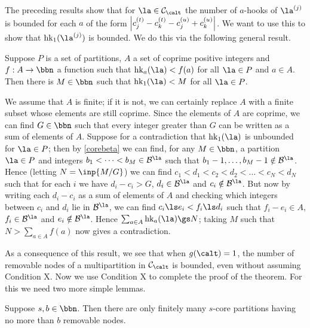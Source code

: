\documentclass[a4paper, 11pt, twoside]{article}
\begin{document}
The preceding results show that for $\la\in\smc\calt$ the number of $a$-hooks of $\cpt\la j$ is bounded for each $a$ of the form $\left|c^{(t)}_j-c^{(t)}_k-c^{(u)}_j+c^{(u)}_k\right|$. We want to use this to show that $\hk1{\cpt\la j}$ is bounded. We do this via the following general result.
	
\begin{propn}\label{hookbd}
Suppose $P$ is a set of partitions, $A$ a set of coprime positive integers and $f:A\to\bbn$ a function such that $\hk a\la<f(a)$ for all $\la\in P$ and $a\in A$. Then there is $M\in\bbn$ such that $\hk1\la<M$ for all $\la\in P$.
\end{propn}

\begin{pf}
We assume that $A$ is finite; if it is not, we can certainly replace $A$ with a finite subset whose elements are still coprime. Since the elements of $A$ are coprime, we can find $G\in\bbn$ such that every integer greater than $G$ can be written as a sum of elements of $A$. Suppose for a contradiction that $\hk1\la$ is unbounded for $\la\in P$; then by \cref{corebeta} we can find, for any $M\in\bbn$, a partition $\la\in P$ and integers $b_1<\dots<b_M\in\be\la$ such that $b_1-1,\dots,b_M-1\notin\be\la$. Hence (letting $N=\inp{M/G}$) we can find $c_1<d_1<c_2<d_2<\dots<c_N<d_N$ such that for each $i$ we have $d_i-c_i>G$, $d_i\in\be\la$ and $c_i\notin\be\la$. But now by writing each $d_i-c_i$ as a sum of elements of $A$ and checking which integers between $c_i$ and $d_i$ lie in $\be\la$, we can find $c_i\ls e_i<f_i\ls d_i$ such that $f_i-e_i\in A$, $f_i\in\be\la$ and $e_i\notin\be\la$. Hence $\sum_{a\in A}\hk a\la\gs N$; taking $M$ such that $N>\sum_{a\in A}f(a)$ now gives a contradiction.
\end{pf}


As a consequence of this result, we see that when $g(\calt)=1$, the number of removable nodes of a multipartition in $\smc\calt$ is bounded, even without assuming Condition X. Now we use Condition X to complete the proof of the theorem. For this we need two more simple lemmas.

\begin{lemma}\label{fincorerem}
Suppose $s,b\in\bbn$. Then there are only finitely many $s$-core partitions having no more than $b$ removable nodes.
\end{lemma}
\end{document}
